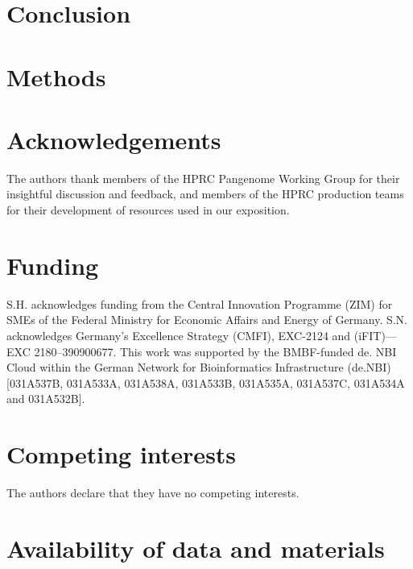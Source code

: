 \documentclass[11pt,hidelinks]{article}
\begin{document}
\section{Conclusion}

\section{Methods}




\section*{Acknowledgements}
The authors thank members of the HPRC Pangenome Working Group for their insightful discussion and feedback, and members of the HPRC production teams for their development of resources used in our exposition.

\section*{Funding}
S.H. acknowledges funding from the Central Innovation Programme (ZIM) for SMEs of the Federal Ministry for Economic Affairs and Energy of Germany. S.N. acknowledges Germany’s Excellence Strategy (CMFI), EXC-2124 and (iFIT)—EXC 2180–390900677. This work was supported by the BMBF-funded de. NBI Cloud within the German Network for Bioinformatics Infrastructure (de.NBI) [031A537B, 031A533A, 031A538A, 031A533B, 031A535A, 031A537C, 031A534A and 031A532B].

\section*{Competing interests}
The authors declare that they have no competing interests.

\section*{Availability of data and materials}
\end{document}
